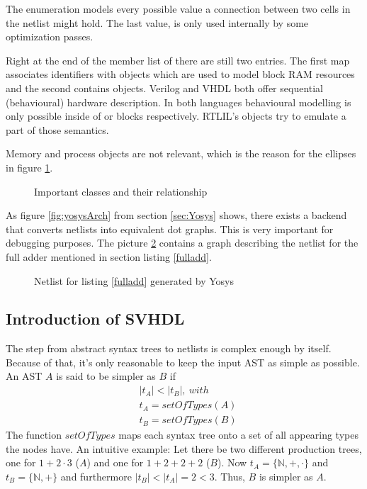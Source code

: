 The enumeration  models every possible value a connection
between two cells in the netlist might hold. The last value,
 is only used internally by some optimization passes.

Right at the end of the member list of  there are still
two entries. The first map associates identifiers with 
objects which are used to model block RAM resources and the second
contains  objects. Verilog and VHDL both offer sequential
(behavioural) hardware description. In both languages behavioural
modelling is only possible inside of  or  blocks
respectively. RTLIL's  objects try to emulate a part of
those semantics.

Memory and process objects are not relevant, which is
the reason for the ellipses in figure \ref{fig:classDiagRtlil}.
%
\begin{figure}[tb]
    \centering
    \caption{Important classes and their relationship}
    
    \label{fig:classDiagRtlil}
\end{figure}
%
As figure \ref{fig:yosysArch} from section \ref{sec:Yosys} shows,
there exists a backend that converts netlists into equivalent dot
graphs. This is very important for debugging purposes. The picture
\ref{fig:rtlilShow} contains a graph describing the netlist for the
full adder mentioned in section listing \ref{fulladd}.
%
\begin{figure}[tb]
    \centering
    \caption{Netlist for listing \ref{fulladd} generated by Yosys}
    
    \label{fig:rtlilShow}
\end{figure}
%
\subsection{Introduction of SVHDL}
\label{sec:svhdl}

The step from abstract syntax trees to netlists is complex enough by
itself. Because of that, it's only reasonable to keep the input AST as
simple as possible. An AST \(A\) is said to be simpler as \(B\) if
%
\begin{align*}
  & \mid t_A \mid < \mid t_B \mid,\ with \\
  & t_A = setOfTypes(A) \\
  & t_B = setOfTypes(B)
\end{align*}
%
The function \(setOfTypes\) maps each syntax tree onto a set of
all appearing types the nodes have. An intuitive example:
Let there be two different
production trees, one for \(1+2 \cdot 3\) (\(A\)) and one for \(1+2+2+2\)
(\(B\)). Now \(t_A = \{\mathbb{N}, +, \cdot\}\) and \(t_B =
\{\mathbb{N},+\}\) and furthermore \(\mid t_B \mid < \mid t_A \mid = 2
< 3\). Thus, \(B\) is simpler as \(A\).

